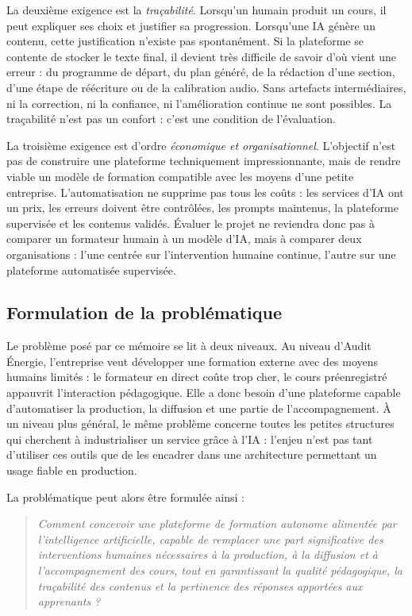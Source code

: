 La deuxième exigence est la \emph{traçabilité}. Lorsqu'un humain produit un cours, il
peut expliquer ses choix et justifier sa progression. Lorsqu'une IA génère un contenu, cette
justification n'existe pas spontanément. Si la plateforme se contente de stocker le texte
final, il devient très difficile de savoir d'où vient une erreur : du programme de départ, du
plan généré, de la rédaction d'une section, d'une étape de réécriture ou de la calibration
audio. Sans artefacts intermédiaires, ni la correction, ni la confiance, ni l'amélioration
continue ne sont possibles. La traçabilité n'est pas un confort : c'est une condition de
l'évaluation.

La troisième exigence est d'ordre \emph{économique et organisationnel}. L'objectif n'est
pas de construire une plateforme techniquement impressionnante, mais de rendre viable un
modèle de formation compatible avec les moyens d'une petite entreprise. L'automatisation
ne supprime pas tous les coûts : les services d'IA ont un prix, les erreurs doivent être
contrôlées, les prompts maintenus, la plateforme supervisée et les contenus validés.
Évaluer le projet ne reviendra donc pas à comparer un formateur humain à un modèle
d'IA, mais à comparer deux organisations : l'une centrée sur l'intervention humaine
continue, l'autre sur une plateforme automatisée supervisée.

\subsection{Formulation de la problématique}

Le problème posé par ce mémoire se lit à deux niveaux. Au niveau d'Audit Énergie,
l'entreprise veut développer une formation externe avec des moyens humains limités : le
formateur en direct coûte trop cher, le cours préenregistré appauvrit l'interaction
pédagogique. Elle a donc besoin d'une plateforme capable d'automatiser la production, la
diffusion et une partie de l'accompagnement. À un niveau plus général, le même problème
concerne toutes les petites structures qui cherchent à industrialiser un service grâce à
l'IA : l'enjeu n'est pas tant d'utiliser ces outils que de les encadrer dans une architecture
permettant un usage fiable en production.

La problématique peut alors être formulée ainsi :

\begin{quote}
\emph{Comment concevoir une plateforme de formation autonome alimentée par
l'intelligence artificielle, capable de remplacer une part significative des interventions
humaines nécessaires à la production, à la diffusion et à l'accompagnement des cours,
tout en garantissant la qualité pédagogique, la traçabilité des contenus et la pertinence
des réponses apportées aux apprenants ?}
\end{quote}

